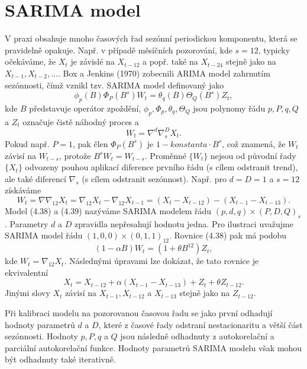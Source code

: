 \section{SARIMA model}

V praxi obsahuje mnoho časových řad sezónní periodickou komponentu, která se pravidelně opakuje. Např. v případě měsíčních pozorování, kde $s = 12$, typicky očekáváme, že $X_t$ je závislé na $X_{t - 12}$ a popř. také na $X_{t - 24}$ stejně jako na $X_{t-1}, X_{t-2}, ...$. Box a Jenkins (1970) zobecnili ARIMA model zahrnutím sezónnosti, čímž vznikl tzv. SARIMA model definovaný jako
\begin{equation}
\phi_p(B)\Phi_P(B^s)W_t = \theta_q(B)\Theta_Q(B^s)Z_t,
\end{equation}
kde $B$ představuje operátor zpoždění, $\phi_p, \Phi_p, \theta_q, \Theta_Q$ jsou polynomy řádu $p, P, q, Q$ a $Z_t$ označuje čistě náhodný proces a
\begin{equation}
W_t = \nabla^d \nabla^D_s X_t.
\end{equation}
Pokud např. $P=1$, pak člen $\Phi_P(B^s)$ je $1 - konstanta \cdot B^s$, což znamená, že $W_t$ závisí na $W_{t-s}$, protože $B^s W_t = W_{t - s}$. Proměnné $\{W_t\}$ nejsou od původní řady $\{X_t\}$ odvozeny pouhou aplikací diference prvního řádu (s cílem odstranit trend), ale také diferencí $\nabla_s$ (s cílem odstranit sezónnost). Např. pro $d = D = 1$ a $s=12$ získáváme
\begin{equation}
W_t = \nabla \nabla_{12} X_t = \nabla_{12}X_t - \nabla_{12}X_{t-1} = (X_t - X_{t-12}) - (X_{t - 1} - X_{t - 13}).
\end{equation}
Model (4.38) a (4.39) nazýváme SARIMA modelem řádu $(p, d, q) \times (P, D, Q)_s$. Parametry $d$ a $D$ zpravidla nepřesahují hodnotu jedna. Pro ilustraci uvažujme SARIMA model řádu $(1, 0, 0) \times (0, 1, 1)_{12}$. Rovnice (4.38) pak má podobu
\begin{equation}
(1 - \alpha B)W_t = (1 + \theta B^12)Z_t,
\end{equation}
kde $W_t = \nabla_{12} X_t$. Následnými úpravami lze dokázat, že tato rovnice je ekvivalentní
\begin{equation}
X_t = X_{t - 12} + \alpha (X_{t - 1} - X_{t - 13}) + Z_t + \theta Z_{t - 12}.
\end{equation}
Jinými slovy $X_t$ závisí na $X_{t - 1}, X_{t - 12}$ a $X_{t - 13}$ stejně jako na $Z_{t - 12}$.

Při kalibraci modelu na pozorovanou časovou řadu se jako první odhadují hodnoty parametrů $d$ a $D$, které z časové řady odstraní nestacionaritu a větší část sezónnosti. Hodnoty $p, P, q$ a $Q$ jsou následně odhadnuty z autokorelační a parciální autokorelační funkce. Hodnoty parametrů SARIMA modelu však mohou být odhadnuty také iterativně.


